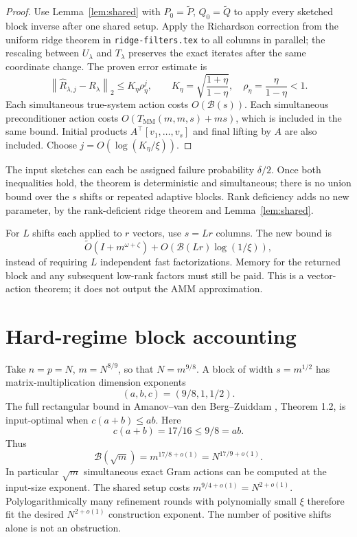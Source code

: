 \documentclass[11pt]{article}
\newcommand{\norm}[1]{\left\lVert#1\right\rVert}
\newcommand{\MM}{T_{\mathrm{MM}}}
\newcommand{\tO}{\widetilde O}
\begin{document}
\begin{proof}
Use Lemma~\ref{lem:shared} with
\(P_0=\widetilde P\), \(Q_0=\widetilde Q\) to apply every
sketched block inverse after one shared setup. Apply the Richardson
correction from the uniform ridge theorem in \texttt{ridge-filters.tex}
to all columns in parallel; the rescaling between \(U_\lambda\)
and \(T_\lambda\) preserves the exact iterates after the same
coordinate change. The proven error estimate is
\[
 \norm{\widehat R_{\lambda,j}-R_\lambda}_2
 \le K_\eta\rho_\eta^j,\qquad
 K_\eta=\sqrt{\frac{1+\eta}{1-\eta}},\quad
 \rho_\eta=\frac\eta{1-\eta}<1.
\]
Each simultaneous true-system action costs \(O(\mathcal B(s))\).
Each simultaneous preconditioner action costs
\(O(\MM(m,m,s)+ms)\), which is included in the same bound.
Initial products \(A^\top[v_1,\ldots,v_s]\) and final lifting
by \(A\) are also included. Choose
\(j=O(\log(K_\eta/\xi))\).
\end{proof}

The input sketches can each be assigned failure probability \(\delta/2\).
Once both inequalities hold, the theorem is deterministic and simultaneous;
there is no union bound over the \(s\) shifts or repeated adaptive blocks.
Rank deficiency adds no new parameter, by the rank-deficient ridge theorem
and Lemma~\ref{lem:shared}.

For \(L\) shifts each applied to \(r\) vectors, use \(s=Lr\)
columns. The new bound is
\[
 \tO(I+m^{\omega+\zeta})+
 O\!\left(\mathcal B(Lr)\log(1/\xi)\right),
\]
instead of requiring \(L\) independent fast factorizations. Memory for
the returned block and any subsequent low-rank factors must still be paid.
This is a vector-action theorem; it does not output the AMM approximation.

\section{Hard-regime block accounting}
Take \(n=p=N\), \(m=N^{8/9}\), so that \(N=m^{9/8}\).
A block of width \(s=m^{1/2}\) has matrix-multiplication dimension
exponents
\[
 (a,b,c)=(9/8,1,1/2).
\]
The full rectangular bound in Amanov--van den Berg--Zuiddam
\cite{avz}, Theorem 1.2, is input-optimal when
\(c(a+b)\le ab\). Here
\[
 c(a+b)=17/16\le9/8=ab.
\]
Thus
\[
 \mathcal B(\sqrt m)=m^{17/8+o(1)}=N^{17/9+o(1)}.
\]
In particular \(\sqrt m\) simultaneous exact Gram actions can be
computed at the input-size exponent. The shared setup costs
\(m^{9/4+o(1)}=N^{2+o(1)}\). Polylogarithmically many refinement
rounds with polynomially small \(\xi\) therefore fit the desired
\(N^{2+o(1)}\) construction exponent. The number of positive shifts
alone is not an obstruction.
\end{document}
